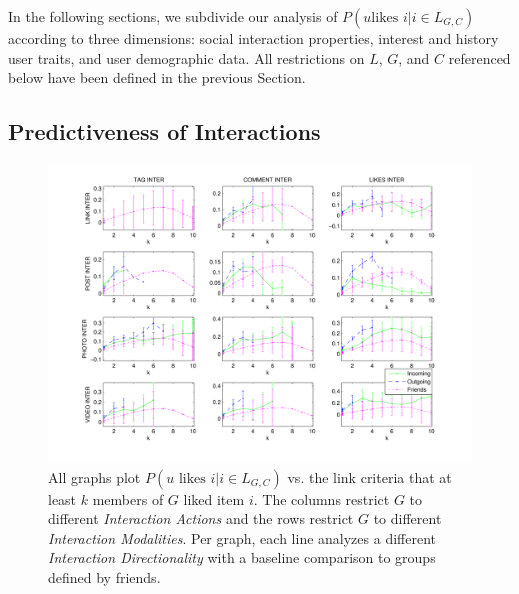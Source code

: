 
In the following sections, we subdivide our analysis of $P(u \mbox{
likes } i | i \in L_{G,C})$ according to three dimensions: social
interaction properties, interest and history user traits, and user
demographic data.  All restrictions on $L$, $G$, and $C$ referenced
below have been defined in the previous Section.

\subsection{Predictiveness of Interactions}

\label{sec:interactions}

\begin{figure}[t!]
\centering
\includegraphics[scale=0.70]{data/likes_vs_inter_fix}
\vspace{-15mm}
\caption{All graphs plot $P(u \mbox{ likes } i | i \in L_{G,C})$
vs. the link criteria that at least $k$ members of $G$ liked item $i$.
The columns restrict $G$ to different 
\textit{Interaction Actions} and the rows restrict $G$ to
different \textit{Interaction Modalities}.  Per graph, each line 
analyzes a different \textit{Interaction Directionality} with
a baseline comparison to groups defined by friends.}
\label{fig:res2}
\end{figure}

